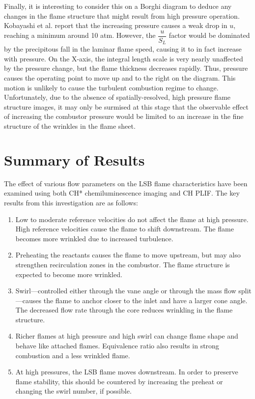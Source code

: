 Finally, it is interesting to consider this on a Borghi diagram to deduce any changes in the flame structure that might result from high pressure operation.
Kobayashi et al.\cite{1997-kobayashi} report that the increasing pressure causes a weak drop in \(u\), reaching a minimum around 10 atm.
However, the \(\dfrac{ u }{ S_L }\) factor would be dominated by the precipitous fall in the laminar flame speed, causing it to in fact increase with pressure.
On the X-axis, the integral length scale is very nearly unaffected by the pressure change, but the flame thickness decreases rapidly.
Thus, pressure causes the operating point to move up and to the right on the diagram.
This motion is unlikely to cause the turbulent combustion regime to change.
Unfortunately, due to the absence of spatially-resolved, high pressure flame structure images, it may only be surmised at this stage that the observable effect of increasing the combustor pressure would be limited to an increase in the fine structure of the wrinkles in the flame sheet.

\section{Summary of Results}

The effect of various flow parameters on the LSB flame characteristics have been examined using both CH* chemiluminescence imaging and CH PLIF.
The key results from this investigation are as follows:

\begin{enumerate}
  \item Low to moderate reference velocities do not affect the flame at high pressure.
    High reference velocities cause the flame to shift downstream.
    The flame becomes more wrinkled due to increased turbulence.
  \item Preheating the reactants causes the flame to move upstream, but may also strengthen recirculation zones in the combustor.
    The flame structure is expected to become more wrinkled.
  \item Swirl---controlled either through the vane angle or through the mass flow split---causes the flame to anchor closer to the inlet and have a larger cone angle.
    The decreased flow rate through the core reduces wrinkling in the flame structure.
  \item Richer flames at high pressure and high swirl can change flame shape and behave like attached flames.
    Equivalence ratio also results in strong combustion and a less wrinkled flame.
  \item At high pressures, the LSB flame moves downstream.
    In order to preserve flame stability, this should be countered by increasing the preheat or changing the swirl number, if possible.
\end{enumerate}


